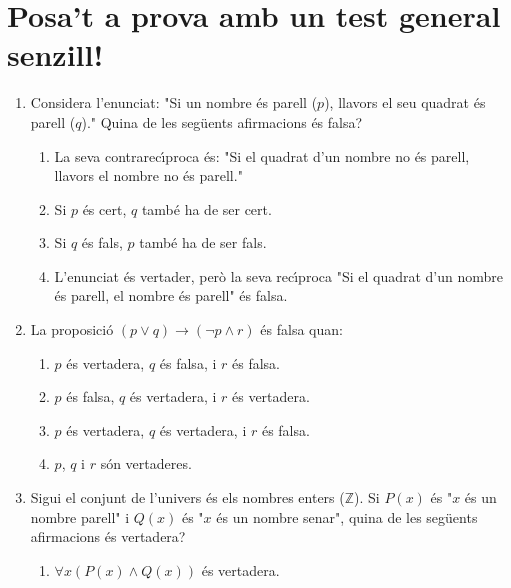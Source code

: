 \section{Posa't a prova amb un test general senzill!}

\begin{enumerate}
\item Considera l'enunciat: "Si un nombre \'{e}s parell ($p$), llavors el seu
quadrat \'{e}s parell ($q$)." Quina de les seg\"{u}ents afirmacions \'{e}s falsa?

\begin{enumerate}
\item La seva contrarec\'{\i}proca \'{e}s: "Si el quadrat d'un nombre no
\'{e}s parell, llavors el nombre no \'{e}s parell."

\item Si $p$ \'{e}s cert, $q$ tamb\'{e} ha de ser cert.

\item Si $q$ \'{e}s fals, $p$ tamb\'{e} ha de ser fals.

\item L'enunciat \'{e}s vertader, per\`{o} la seva rec\'{\i}proca "Si el
quadrat d'un nombre \'{e}s parell, el nombre \'{e}s parell" \'{e}s falsa.
\end{enumerate}

\item La proposici\'{o} $(p\vee q)\rightarrow(\lnot p\wedge r)$ \'{e}s falsa quan:

\begin{enumerate}
\item $p$ \'{e}s vertadera, $q$ \'{e}s falsa, i $r$ \'{e}s falsa.

\item $p$ \'{e}s falsa, $q$ \'{e}s vertadera, i $r$ \'{e}s vertadera.

\item $p$ \'{e}s vertadera, $q$ \'{e}s vertadera, i $r$ \'{e}s falsa.

\item $p$, $q$ i $r$ s\'{o}n vertaderes.
\end{enumerate}

\item Sigui el conjunt de l'univers \'{e}s els nombres enters ($\mathbb{Z}$).
Si $P(x)$ \'{e}s "$x$ \'{e}s un nombre parell" i $Q(x)$ \'{e}s "$x$ \'{e}s un
nombre senar", quina de les seg\"{u}ents afirmacions \'{e}s vertadera?

\begin{enumerate}
\item $\forall x(P(x)\wedge Q(x))$ \'{e}s vertadera.


\end{enumerate}
\end{enumerate}
